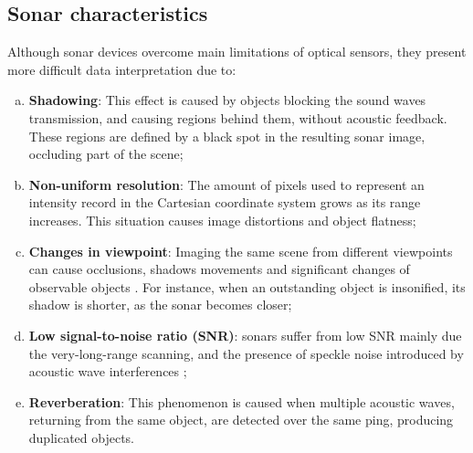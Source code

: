 \documentclass[final,5p,times]{elsarticle}
\begin{document}

\subsection{Sonar characteristics}
\label{sonar:characteristics}

Although sonar devices overcome main limitations of optical sensors, they
present more difficult data interpretation due to:

\begin{enumerate}[a)]
    \item \textbf{Shadowing}: This effect is caused by objects blocking the
sound waves transmission, and causing regions behind them, without acoustic feedback. These regions are defined by a black spot in the resulting sonar image, occluding part of the scene;
    \item \textbf{Non-uniform resolution}: The amount of pixels used to represent an intensity record in the Cartesian coordinate system grows as its range increases. This situation causes image distortions and object flatness;
    \item \textbf{Changes in viewpoint}: Imaging the same scene from different viewpoints can cause occlusions, shadows movements and significant  changes of observable objects \cite{hurtos2014}. For instance, when an    outstanding object is insonified, its shadow is shorter, as the sonar becomes closer;
    \item \textbf{Low signal-to-noise ratio (SNR)}: sonars suffer from low SNR mainly due the very-long-range scanning, and the presence of speckle noise introduced by acoustic wave interferences \cite{abbott1979};
    \item \textbf{Reverberation}: This phenomenon is caused when multiple acoustic waves, returning from the same object, are detected over the same ping, producing duplicated objects.
\end{enumerate}
\end{document}
